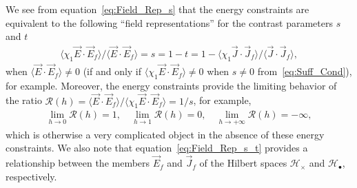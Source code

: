 \documentclass{cmslatex}
\begin{document}
 We see from equation~\eqref{eq:Field_Rep_s} that the energy
 constraints are equivalent to the following ``field representations''
 for the contrast parameters $s$ and $t$
%
\begin{align}\label{eq:Field_Rep_s_t}
  \langle\chi_1\vec{E}\cdot\vec{E}_f\rangle/\langle\vec{E}\cdot\vec{E}_f\rangle
  =s=1-t
  =1- \langle\chi_1\vec{J}\cdot\vec{J}_f\rangle/\langle\vec{J}\cdot\vec{J}_f\rangle,
\end{align}
%
when $\langle\vec{E}\cdot\vec{E}_f\rangle\neq0$ (if and only if
$\langle\chi_1\vec{E}\cdot\vec{E}_f\rangle\neq0$ when $s\neq0$ from~\eqref{eq:Suff_Cond}), for
example. Moreover, the energy constraints provide the limiting
behavior of the ratio
$\mathcal{R}(h)=\langle\vec{E}\cdot\vec{E}_f\rangle/\langle\chi_1\vec{E}\cdot\vec{E}_f\rangle=1/s$, for example,    
%
\begin{align}
  \lim_{h\to0}\mathcal{R}(h)=1, \quad
  \lim_{h\to1}\mathcal{R}(h)=0, \quad
  \lim_{h\to+\infty}\mathcal{R}(h)=-\infty,
\end{align}
%
which is otherwise a very complicated object in the absence of these
energy constraints.
We also note that equation~\eqref{eq:Field_Rep_s_t} provides
a relationship between the members $\vec{E}_f$ and $\vec{J}_f$ of the
Hilbert spaces $\mathscr{H}_\times$ and $\mathscr{H}_{\bullet}$,
respectively. 
\end{document}
